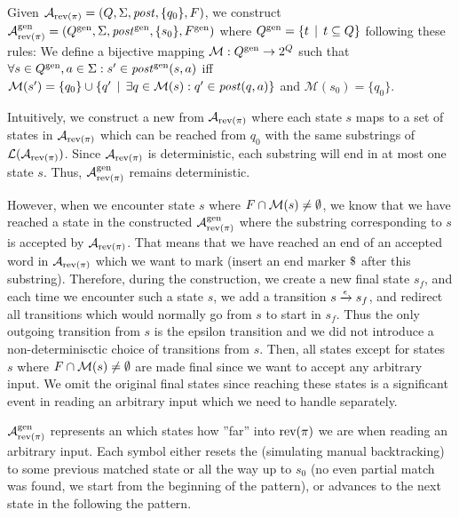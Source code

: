 Given $\mathcal{A}_{\text{rev(}\pi\text{)}} = (Q, \Sigma, \mathit{post}, \{ q_0 \}, F)$, we construct $\mathcal{A}^{\text{gen}}_{\text{rev(}\pi\text{)}} = (Q^{\text{gen}}, \Sigma, \mathit{post}^{\text{gen}}, \{ s_0 \}, F^{\text{gen}})$ where $Q^{\text{gen}} = \{ t \,\mid\, t \subseteq Q \}$ following these rules:\newline
We define a bijective mapping $\mathcal{M}: Q^{\text{gen}} \rightarrow 2^{Q }$ such that $\forall s \in Q^{\text{gen}}, a \in \Sigma: s' \in \mathit{post}^{\text{gen}}(s, a)$
iff $\mathcal{M}(s') = \{ q_0 \} \cup \{ q' \,\mid\, \exists q \in \mathcal{M}(s): q' \in \mathit{post}(q, a) \}$
and $\mathcal{M}(s_0) = \{ q_0 \}$.

Intuitively, we construct a new \dfa from $\mathcal{A}_{\text{rev(}\pi\text{)}}$ where each state $s$ maps to a set of states in $\mathcal{A}_{\text{rev(}\pi\text{)}}$ which can be reached from $q_0$ with the same substrings of $\mathcal{L}(\mathcal{A}_{\text{rev(}\pi\text{)}})$.
Since $\mathcal{A}_{\text{rev(}\pi\text{)}}$ is deterministic, each substring will end in at most one state $s$.
Thus, $\mathcal{A}^{\text{gen}}_{\text{rev(}\pi\text{)}}$ remains deterministic.

However, when we encounter state $s$ where $F \cap \mathcal{M}(s) \neq \emptyset$, we know that we have reached a state in the constructed $\mathcal{A}^{\text{gen}}_{\text{rev(}\pi\text{)}}$ where the substring corresponding to $s$ is accepted by $\mathcal{A}_{\text{rev(}\pi\text{)}}$.
That means that we have reached an end of an accepted word in $\mathcal{A}_{\text{rev(}\pi\text{)}}$ which we want to mark (insert an end marker $\marker$ after this substring).
Therefore, during the construction, we create a new final state $s_f$, and each time we encounter such a state $s$, we add a transition ${s} \xrightarrow{{\epsilon}} {s_f}$, and redirect all transitions which would normally go from $s$ to start in $s_f$.
Thus the only outgoing transition from $s$ is the epsilon transition and we did not introduce a non-determinisctic choice of transitions from $s$.
Then, all states except for states $s$ where $F \cap \mathcal{M}(s) \neq \emptyset$ are made final since we want to accept any arbitrary input.
We omit the original final states since reaching these states is a significant event in reading an arbitrary input which we need to handle separately.

$\mathcal{A}^{\text{gen}}_{\text{rev(}\pi\text{)}}$ represents an \dfa which states how ''far'' into $\text{rev(}\pi\text{)}$ we are when reading an arbitrary input.
Each symbol either resets the \dfa (simulating manual backtracking) to some previous matched state or all the way up to $s_0$ (no even partial match was found, we start from the beginning of the pattern), or advances to the next state in the \dfa following the pattern.


